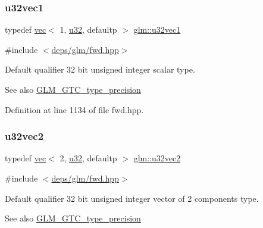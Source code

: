 \mbox{\label{group__gtc__type__precision_ga99f64714ce341e34036bd10c8b36823a}} 
\subsubsection{\texorpdfstring{u32vec1}{u32vec1}}
{\footnotesize\ttfamily typedef \hyperlink{structglm_1_1vec}{vec}$<$ 1, \hyperlink{group__gtc__type__precision_ga54e837745059fd29017bed71cfa0a8db}{u32}, defaultp $>$ \hyperlink{group__gtc__type__precision_ga99f64714ce341e34036bd10c8b36823a}{glm\+::u32vec1}}



{\ttfamily \#include $<$\hyperlink{fwd_8hpp}{deps/glm/fwd.\+hpp}$>$}

Default qualifier 32 bit unsigned integer scalar type. \begin{DoxySeeAlso}{See also}
\hyperlink{group__gtc__type__precision}{G\+L\+M\+\_\+\+G\+T\+C\+\_\+type\+\_\+precision} 
\end{DoxySeeAlso}


Definition at line 1134 of file fwd.\+hpp.

\mbox{\label{group__gtc__type__precision_gad854a1005ce84d8f6e8f05e42893f5c9}} 
\subsubsection{\texorpdfstring{u32vec2}{u32vec2}}
{\footnotesize\ttfamily typedef \hyperlink{structglm_1_1vec}{vec}$<$ 2, \hyperlink{group__gtc__type__precision_ga54e837745059fd29017bed71cfa0a8db}{u32}, defaultp $>$ \hyperlink{group__gtc__type__precision_gad854a1005ce84d8f6e8f05e42893f5c9}{glm\+::u32vec2}}



{\ttfamily \#include $<$\hyperlink{fwd_8hpp}{deps/glm/fwd.\+hpp}$>$}

Default qualifier 32 bit unsigned integer vector of 2 components type. \begin{DoxySeeAlso}{See also}
\hyperlink{group__gtc__type__precision}{G\+L\+M\+\_\+\+G\+T\+C\+\_\+type\+\_\+precision} 
\end{DoxySeeAlso}


